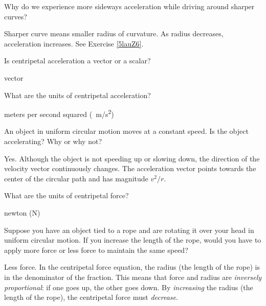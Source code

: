 \documentclass[../main-physics-problems.tex]{subfiles}
\begin{document}
\begin{questions}
\question \label{KB7t4k} %
Why do we experience more sideways acceleration while driving around sharper curves?

\begin{solution}
Sharper curve means smaller radius of curvature. As radius decreases, acceleration increases. See Exercise \ref{5lauZ6}.
\end{solution}


\question \label{jb3iGO} %
Is centripetal acceleration a vector or a scalar?

\begin{solution}
vector
\end{solution}


\question \label{TUxTQh} %
What are the units of centripetal acceleration?

\begin{solution}
meters per second squared (\SI{}{m/s^2})
\end{solution}





\question \label{IAjJBC} %
An object in uniform circular motion moves at a constant speed. Is the object accelerating? Why or why not?

\begin{solution}
Yes. Although the object is not speeding up or slowing down, the direction of the velocity vector continuously changes. The acceleration vector points towards the center of the circular path and has magnitude $v^2/r$.
\end{solution}






\question \label{9YKhPo} %
What are the units of centripetal force?

\begin{solution}
newton (N)
\end{solution}

\question \label{aVu3ZA} %
Suppose you have an object tied to a rope and are rotating it over your head in uniform circular motion. If you increase the length of the rope, would you have to apply more force or less force to maintain the same speed?

\begin{solution}
Less force. In the centripetal force equation, the radius (the length of the rope) is in the denominator of the fraction. This means that force and radius are \textit{inversely proportional}: if one goes up, the other goes down. By \textit{increasing} the radius (the length of the rope), the centripetal force must \textit{decrease}.
\end{solution}


\end{questions}
\end{document}
